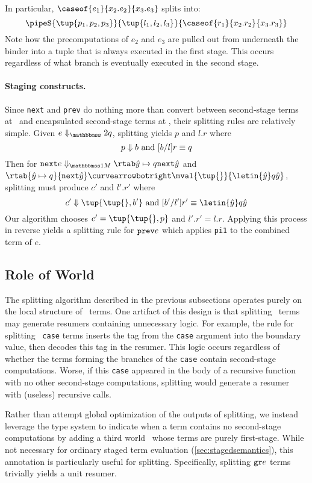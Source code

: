 \begin{abstrsyn}
In particular, $\caseof{e_1}{x_2.e_2}{x_3.e_3}$ splits into:
\[
\pipeS {\tup{p_1,p_2,p_3}} {\tup{l_1,l_2,l_3}} {\caseof{r_1}{x_2.r_2}{x_3.r_3}}
\]
Note how the precomputations of $e_2$ and $e_3$ are pulled out from
underneath the binder into a tuple that is always executed in the
first stage. This occurs regardless of what branch is eventually
executed in the second stage.

\paragraph{Staging constructs.}
Since \texttt{next} and \texttt{prev} do nothing more than convert between 
second-stage terms at \bbtwo\ and encapsulated second-stage terms at \bbonem,
their splitting rules are relatively simple.
Given $\diatwo e q$, splitting yields $p$ and $l.r$ where
\[
	{p} \Downarrow {b} \text{ and } [b/l]r \equiv q
\]
Then for $\diaone {\next {e}} {{\hat y} \mapsto q} {\next {\hat y}}$
and\\ $\rtab {{\hat y} \mapsto q} {\next {\hat y}} \vsplito \mval {\tup{}} {\letin {\hat y} q {\hat y}}$, splitting must produce $c'$ and $l'.r'$ where
\[
	\reduce {c'} {\tup {\tup{},b'}} \text{ and } [b'/l']r' \equiv \letin {\hat y} q {\hat y}
\]
Our algorithm chooses $c' = \tup{\tup{},p}$ and $l'.r' = l.r$.
Applying this process in reverse yields a splitting rule for ${\tt prev} e$ which applies \texttt{pi1} to the combined term of $e$.

\subsection {Role of World \bbonep}
\label{sec:needGround}

The splitting algorithm described in the previous subsections operates
purely on the local structure of \lang\ terms.  One artifact of this design
is that splitting \bbonem\ terms may generate resumers containing
unnecessary logic.  For example, the rule for splitting
\bbonem\ \texttt{case} terms inserts the tag from the \texttt{case}
argument into the boundary value, then decodes this tag in the
resumer. This logic occurs regardless of whether the terms forming the
branches of the \texttt{case} contain second-stage computations.
Worse, if this \texttt{case} appeared in the body of a recursive
function with no other second-stage computations, splitting would
generate a resumer with (useless) recursive calls.

Rather than attempt global optimization of the outputs of splitting,
we instead leverage the type system to indicate when a term contains
no second-stage computations by adding a third world \bbonep\ whose
terms are purely first-stage.  While not necessary for ordinary staged
term evaluation (\ref{sec:stagedsemantics}), this annotation is
particularly useful for splitting. Specifically, splitting ${\tt gr} e$
terms trivially yields a unit resumer.


\end{abstrsyn}
